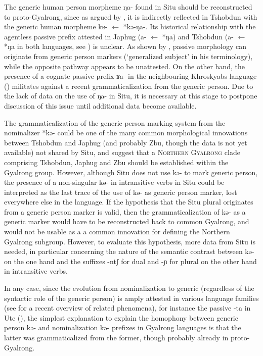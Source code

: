 \documentclass[oldfontcommands,oneside,a4paper,11pt]{article}
\newcommand{\ipa}[1]{{\phon \mbox{#1}}} %
\begin{document}
The generic human person morpheme \ipa{ŋa-} found in Situ should be reconstructed to proto-Gyalrong, since as argued by  \citet[244]{sun14generic}, it is indirectly reflected in Tshobdun with the generic human morpheme \ipa{kɐ-} $\leftarrow$ *\ipa{kə-ŋa-}. Its historical relationship with the  agentless passive prefix attested in Japhug  (\ipa{a-} $\leftarrow$ *\ipa{ŋa}) and Tshobdun (\ipa{a-} $\leftarrow$ *\ipa{ŋa} in both languages, see \citealt{jacques12demotion}) is unclear. As shown by \citet[49-50]{haspelmath90passive}, passive morphology can originate from generic person markers (`generalized subject' in his terminology), while the opposite pathway appears to be unattested. On the other hand, the presence of a cognate passive prefix \ipa{ʁa-} in the neighbouring Khroskyabs language (\citealt[152-154]{lai13affixale}) militates against a recent grammaticalization from the generic person. Due to the lack of data on the use of \ipa{ŋa-} in Situ, it is necessary at this stage to postpone discussion of this issue until additional data become available.


The grammaticalization of the generic person marking system from the nominalizer *\ipa{kə-} could be one of the many common morphological innovations between Tshobdun and Japhug (and probably Zbu, though the data is not yet available) not shared by Situ, and suggest that a \textsc{Northern Gyalrong} clade comprising Tshobdun, Japhug and Zbu should be established within the Gyalrong group. However, although Situ does not use \ipa{kə-} to mark generic person,  the presence of a non-singular \ipa{kə-} in intransitive verbs in Situ could be interpreted as the last trace of the use of \ipa{kə-} as generic person marker, lost everywhere else in the language. If the hypothesis that the Situ plural originates from a generic person marker is valid, then the grammaticalization  of \ipa{kə-} as a generic marker would have to be reconstructed back to common Gyalrong, and would not be usable as a a common innovation for defining the Northern Gyalrong subgroup. However, to evaluate  this hypothesis, more data from Situ is needed, in particular concerning the nature of the semantic contrast between \ipa{kə-} on the one hand and the suffixes \ipa{-ntʃ} for dual and \ipa{-ɲ} for plural on the other hand in intransitive verbs.

In any case, since the evolution from nominalization to generic (regardless of the syntactic role of the generic person) is amply attested in various language families (see \citealt{sanso14nmlz} for a recent overview of related phenomena), for instance the passive \ipa{-ta} in Ute (\citealt[264-7]{givon11ute}), the simplest explanation to explain the homophony between generic person \ipa{kə-} and nominalization \ipa{kə-} prefixes in Gyalrong languages is that the latter was grammaticalized from the former, though probably already in proto-Gyalrong.
\end{document}
